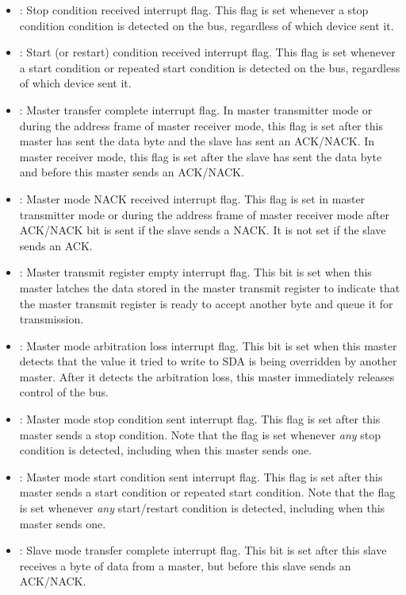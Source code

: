 \begin{itemize}
	\item {}: Stop condition received interrupt flag. This flag is set whenever a stop condition condition is detected on the bus, regardless of which device sent it.
	\item {}: Start (or restart) condition received interrupt flag. This flag is set whenever a start condition or repeated start condition is detected on the bus, regardless of which device sent it.
	\item {}: Master transfer complete interrupt flag. In master transmitter mode or during the address frame of master receiver mode, this flag is set after this master has sent the data byte and the slave has sent an ACK/NACK. In master receiver mode, this flag is set after the slave has sent the data byte and before this master sends an ACK/NACK.
	\item {}: Master mode NACK received interrupt flag. This flag is set in master transmitter mode or during the address frame of master receiver mode after ACK/NACK bit is sent if the slave sends a NACK. It is not set if the slave sends an ACK.
	\item {}: Master transmit register empty interrupt flag. This bit is set when this master latches the data stored in the master transmit register to indicate that the master transmit register is ready to accept another byte and queue it for transmission.
	\item {}: Master mode arbitration loss interrupt flag. This bit is set when this master detects that the value it tried to write to SDA is being overridden by another master. After it detects the arbitration loss, this master immediately releases control of the bus.
	\item {}: Master mode stop condition sent interrupt flag. This flag is set after this master sends a stop condition. Note that the  flag is set whenever \textit{any} stop condition is detected, including when this master sends one.
	\item {}: Master mode start condition sent interrupt flag. This flag is set after this master sends a start condition or repeated start condition. Note that the  flag is set whenever \textit{any} start/restart condition is detected, including when this master sends one.
	\item {}: Slave mode transfer complete interrupt flag. This bit is set after this slave receives a byte of data from a master, but before this slave sends an ACK/NACK.

\end{itemize}
